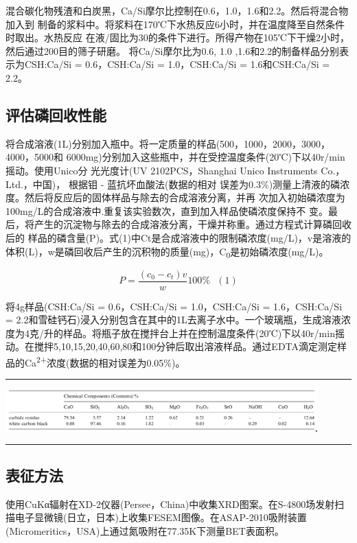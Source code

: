 \documentclass[11pt]{article}
\begin{document}
混合碳化物残渣和白炭黑，Ca/Si摩尔比控制在0.6，1.0，1.6和2.2。然后将混合物加入到
制备的浆料中。将浆料在170℃下水热反应6小时，并在温度降至自然条件时取出。水热反应
在液/固比为30的条件下进行。所得产物在105℃下干燥2小时，然后通过200目的筛子研磨。
将Ca/Si摩尔比为0.6, 1.0 ,1.6和2.2的制备样品分别表示为CSH:Ca/Si = 0.6，CSH:Ca/Si = 1.0，CSH:Ca/Si = 1.6和CSH:Ca/Si = 2.2。
\subsection{评估磷回收性能}
\label{sec:orgddfb468}
将合成溶液(1L)分别加入瓶中。将一定质量的样品(500，1000，2000，3000，4000，5000和
6000mg)分别加入这些瓶中，并在受控温度条件(20℃)下以40r/min摇动。使用Unico分
光光度计(UV 2102PCS，Shanghai Unico Instruments Co.，Ltd.，中国)，
\cite{gustafsson08_phosp_remov_by_miner_based} 根据钼 - 蓝抗坏血酸法(数据的相对
误差为0.3\%)测量上清液的磷浓度。然后将反应后的固体样品与除去的合成溶液分离，并再
次加入初始磷浓度为100mg/L的合成溶液中.重复该实验数次，直到加入样品使磷浓度保持不
变。最后，将产生的沉淀物与除去的合成溶液分离，干燥并称重。通过方程式计算磷回收后的
样品的磷含量(P)。式(1)中Ct是合成溶液中的限制磷浓度(mg/L)，v是溶液的体积(L)，w是磷回收后产生的沉积物的质量(mg)，C\textsubscript{0}是初始磷浓度(mg/L)。

\[P = \frac{(c_{0} - c_{t})v}{w} 100\% \ \ \  (1)\]

将4g样品(CSH:Ca/Si = 0.6，CSH:Ca/Si = 1.0，CSH:Ca/Si = 1.6，CSH:Ca/Si = 2.2和雪硅钙石)浸入分别包含在其中的1L去离子水中。一个玻璃瓶，生成溶液浓度为4克/升的样品。将瓶子放在搅拌台上并在控制温度条件(20℃)下以40r/min摇动。在搅拌5,10,15,20,40,60,80和100分钟后取出溶液样品。通过EDTA滴定测定样品的Ca\textsuperscript{2+}浓度(数据的相对误差为0.05\%)。\cite{kim03_effec_ph_sulfat_sodium_edta_titrat_calcium}

\noindent\rule{\textwidth}{0.5pt}

\includegraphics[width=0.9\textwidth]{table.1.new.png}
 \label{tab:title}

\noindent\rule{\textwidth}{0.5pt}

\subsection{表征方法}
\label{sec:orgc61bcba}
\setlength{\parindent}{1.0cm}
使用CuKα辐射在XD-2仪器(Persee，China)中收集XRD图案。在S-4800场发射扫描电子显微镜(日立，日本)上收集FESEM图像。在ASAP-2010吸附装置(Micromeritics，USA)上通过氮吸附在77.35K下测量BET表面积。
\par
\end{document}
